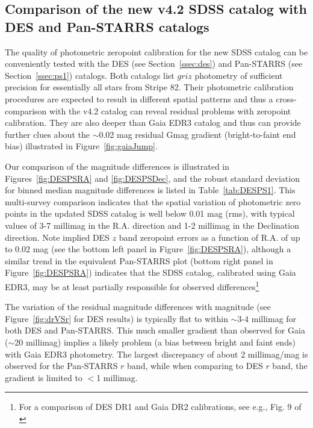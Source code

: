 \documentclass[fleqn,usenatbib]{mnras}
\begin{document}
  

\subsection{Comparison of the new v4.2 SDSS catalog with DES and Pan-STARRS catalogs \label{sec:DESPS1}} 
  
The quality of photometric zeropoint calibration for the new SDSS catalog can be conveniently
tested with the DES (see Section~\ref{ssec:des}) and Pan-STARRS (see Section~\ref{ssec:ps1}) catalogs. 
Both catalogs list $griz$ photometry of sufficient precision for essentially all stars
from Stripe 82. Their photometric calibration procedures are expected to result in different 
spatial patterns and thus a cross-comparison with the v4.2 catalog can reveal residual problems
with zeropoint calibration. They are also deeper than Gaia EDR3 catalog and thus can provide
further clues about the $\sim$0.02 mag residual Gmag gradient (bright-to-faint end bias) 
illustrated in Figure~\ref{fig:gaiaJump}. 

Our comparison of the magnitude differences is illustrated in Figures~\ref{fig:DESPSRA} and \ref{fig:DESPSDec},
and the robust standard deviation for binned median magnitude differences is listed in Table~\ref{tab:DESPS1}. 
This multi-survey comparison indicates that the spatial variation of photometric zero points in the 
updated SDSS catalog is well below 0.01 mag (rms), with typical values of 3-7 millimag in the R.A. 
direction and 1-2 millimag in the Declination direction. Note implied DES $z$ band zeropoint errors 
as a function of R.A. of up to 0.02 mag (see the bottom left panel in Figure~\ref{fig:DESPSRA}), although a 
similar trend in the equivalent Pan-STARRS plot (bottom right panel in Figure~\ref{fig:DESPSRA}) indicates 
that the SDSS catalog, calibrated using Gaia EDR3, may be at least partially responsible for observed 
differences\footnote{For a comparison of DES DR1 and Gaia DR2 calibrations, see e.g., Fig. 9 of \citet{2018ApJS..239...18A}}

The variation of the residual magnitude differences with magnitude (see Figure~\ref{fig:drVSr} for DES results) 
is typically flat to within $\sim$3-4 millimag for both DES and Pan-STARRS. This much smaller gradient than observed 
for Gaia ($\sim$20 millimag) implies a likely problem (a bias between bright and faint ends) with Gaia EDR3 
photometry. The largest discrepancy of about 2 millimag/mag is observed for the Pan-STARRS $r$ band, 
while when comparing to DES $r$ band, the gradient is limited to $<$1 millimag. 
\end{document}
